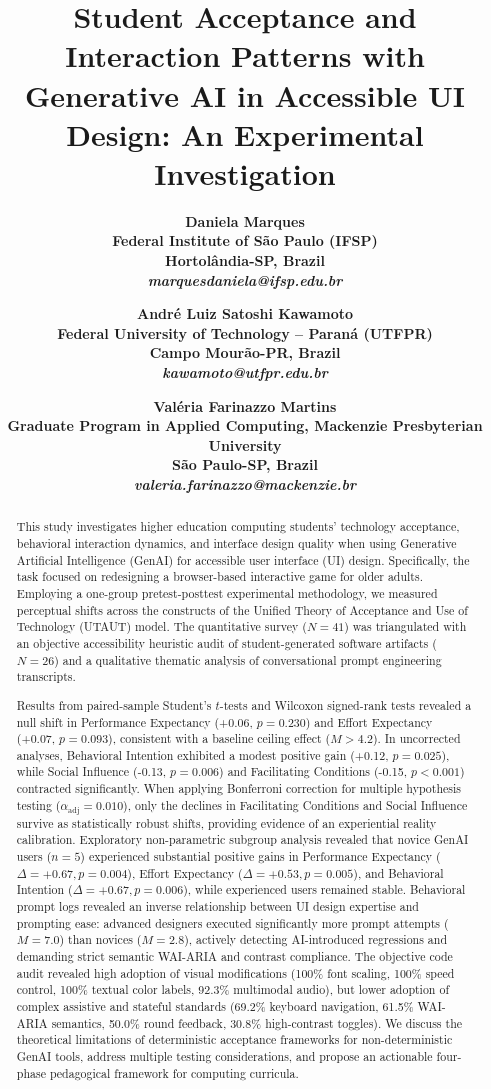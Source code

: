 \documentclass{cleiej}
\title{Student Acceptance and Interaction Patterns with Generative AI in Accessible UI Design: An Experimental Investigation}
\author{
\bf Daniela Marques\\
Federal Institute of S\~{a}o Paulo (IFSP)\\
Hortol\^{a}ndia-SP, Brazil \\
\it marquesdaniela@ifsp.edu.br
\and
\bf Andr\'{e} Luiz Satoshi Kawamoto\\
Federal University of Technology -- Paran\'{a} (UTFPR)\\
Campo Mour\~{a}o-PR, Brazil \\
\it kawamoto@utfpr.edu.br
\and
\bf Val\'{e}ria Farinazzo Martins\\
Graduate Program in Applied Computing, Mackenzie Presbyterian University\\
S\~{a}o Paulo-SP, Brazil \\
\it valeria.farinazzo@mackenzie.br
}
\begin{document}
\maketitle

\begin{abstract}
\noindent This study investigates higher education computing students' technology acceptance, behavioral interaction dynamics, and interface design quality when using Generative Artificial Intelligence (GenAI) for accessible user interface (UI) design. Specifically, the task focused on redesigning a browser-based interactive game for older adults. Employing a one-group pretest-posttest experimental methodology, we measured perceptual shifts across the constructs of the Unified Theory of Acceptance and Use of Technology (UTAUT) model. The quantitative survey ($N = 41$) was triangulated with an objective accessibility heuristic audit of student-generated software artifacts ($N = 26$) and a qualitative thematic analysis of conversational prompt engineering transcripts.

Results from paired-sample Student's $t$-tests and Wilcoxon signed-rank tests revealed a null shift in Performance Expectancy (+0.06, $p = 0.230$) and Effort Expectancy (+0.07, $p = 0.093$), consistent with a baseline ceiling effect ($M > 4.2$). In uncorrected analyses, Behavioral Intention exhibited a modest positive gain (+0.12, $p = 0.025$), while Social Influence (-0.13, $p = 0.006$) and Facilitating Conditions (-0.15, $p < 0.001$) contracted significantly. When applying Bonferroni correction for multiple hypothesis testing ($\alpha_{\text{adj}} = 0.010$), only the declines in Facilitating Conditions and Social Influence survive as statistically robust shifts, providing evidence of an experiential reality calibration. Exploratory non-parametric subgroup analysis revealed that novice GenAI users ($n = 5$) experienced substantial positive gains in Performance Expectancy ($\Delta = +0.67, p = 0.004$), Effort Expectancy ($\Delta = +0.53, p = 0.005$), and Behavioral Intention ($\Delta = +0.67, p = 0.006$), while experienced users remained stable. Behavioral prompt logs revealed an inverse relationship between UI design expertise and prompting ease: advanced designers executed significantly more prompt attempts ($M = 7.0$) than novices ($M = 2.8$), actively detecting AI-introduced regressions and demanding strict semantic WAI-ARIA and contrast compliance. The objective code audit revealed high adoption of visual modifications (100\% font scaling, 100\% speed control, 100\% textual color labels, 92.3\% multimodal audio), but lower adoption of complex assistive and stateful standards (69.2\% keyboard navigation, 61.5\% WAI-ARIA semantics, 50.0\% round feedback, 30.8\% high-contrast toggles). We discuss the theoretical limitations of deterministic acceptance frameworks for non-deterministic GenAI tools, address multiple testing considerations, and propose an actionable four-phase pedagogical framework for computing curricula.
\end{abstract}
\end{document}
